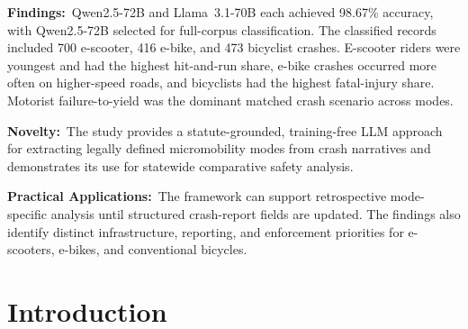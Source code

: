 \documentclass[numbered]{trbunofficial}
\begin{document}
\hfill\break%
\noindent\textbf{Findings:}~Qwen2.5-72B and Llama~3.1-70B each achieved 98.67\% accuracy, with Qwen2.5-72B selected for full-corpus classification. The classified records included 700 e-scooter, 416 e-bike, and 473 bicyclist crashes. E-scooter riders were youngest and had the highest hit-and-run share, e-bike crashes occurred more often on higher-speed roads, and bicyclists had the highest fatal-injury share. Motorist failure-to-yield was the dominant matched crash scenario across modes.

\hfill\break%
\noindent\textbf{Novelty:}~The study provides a statute-grounded, training-free LLM approach for extracting legally defined micromobility modes from crash narratives and demonstrates its use for statewide comparative safety analysis.

\hfill\break%
\noindent\textbf{Practical Applications:}~The framework can support retrospective mode-specific analysis until structured crash-report fields are updated. The findings also identify distinct infrastructure, reporting, and enforcement priorities for e-scooters, e-bikes, and conventional bicycles.

\newpage

\section{Introduction}
\label{sec:intro}




\end{document}
